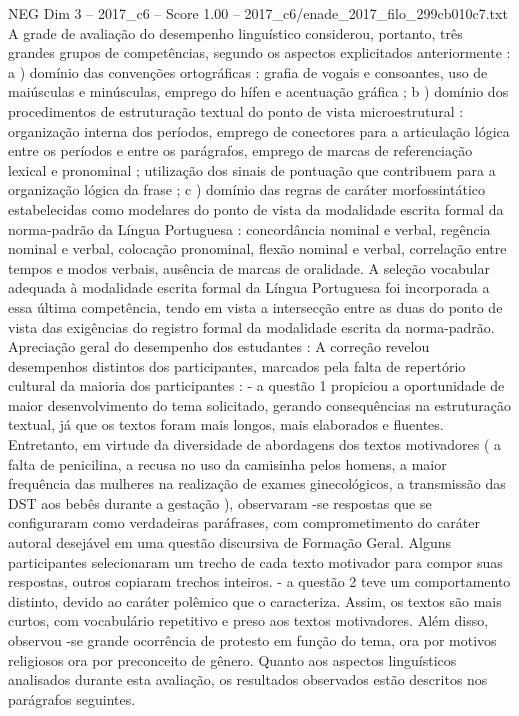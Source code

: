 \begin{textsample}{NEG Dim 3 – 2017\_c6 – Score 1.00 – 2017\_c6/enade\_2017\_filo\_299cb010c7.txt}
A grade de avaliação do desempenho linguístico considerou, portanto, três grandes grupos de competências, segundo os aspectos explicitados anteriormente : a ) domínio das convenções ortográficas : grafia de vogais e consoantes, uso de maiúsculas e minúsculas, emprego do hífen e acentuação gráfica ; b ) domínio dos procedimentos de estruturação textual do ponto de vista microestrutural : organização interna dos períodos, emprego de conectores para a articulação lógica entre os períodos e entre os parágrafos, emprego de marcas de referenciação lexical e pronominal ; utilização dos sinais de pontuação que contribuem para a organização lógica da frase ; c ) domínio das regras de caráter morfossintático estabelecidas como modelares do ponto de vista da modalidade escrita formal da norma-padrão da Língua Portuguesa : concordância nominal e verbal, regência nominal e verbal, colocação pronominal, flexão nominal e verbal, correlação entre tempos e modos verbais, ausência de marcas de oralidade.
A seleção vocabular adequada à modalidade escrita formal da Língua Portuguesa foi incorporada a essa última competência, tendo em vista a intersecção entre as duas do ponto de vista das exigências do registro formal da modalidade escrita da norma-padrão.
Apreciação geral do desempenho dos estudantes : A correção revelou desempenhos distintos dos participantes, marcados pela falta de repertório cultural da maioria dos participantes : - a questão 1 propiciou a oportunidade de maior desenvolvimento do tema solicitado, gerando consequências na estruturação textual, já que os textos foram mais longos, mais elaborados e fluentes.
Entretanto, em virtude da diversidade de abordagens dos textos motivadores ( a falta de penicilina, a recusa no uso da camisinha pelos homens, a maior frequência das mulheres na realização de exames ginecológicos, a transmissão das DST aos bebês durante a gestação ), observaram -se respostas que se configuraram como verdadeiras paráfrases, com comprometimento do caráter autoral desejável em uma questão discursiva de Formação Geral.
Alguns participantes selecionaram um trecho de cada texto motivador para compor suas respostas, outros copiaram trechos inteiros. - a questão 2 teve um comportamento distinto, devido ao caráter polêmico que o caracteriza.
Assim, os textos são mais curtos, com vocabulário repetitivo e preso aos textos motivadores.
Além disso, observou -se grande ocorrência de protesto em função do tema, ora por motivos religiosos ora por preconceito de gênero.
Quanto aos aspectos linguísticos analisados durante esta avaliação, os resultados observados estão descritos nos parágrafos seguintes.

\end{textsample}
